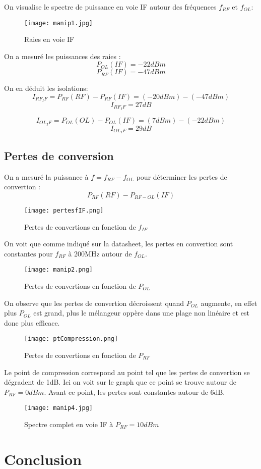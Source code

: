 \documentclass[oneside,a4paper,12pt]{article}
\begin{document}
	On visualise le spectre de puissance en voie IF autour des fréquences $f_{RF}$ et $f_{OL}$:

	\begin{figure}[h]
		\centering
		\texttt{[image: manip1.jpg]}	
		\caption{Raies en voie IF}
	\end{figure}

	On a mesuré les puissances des raies :
	\[ P_{OL}(IF) = -22dBm \]
	\[ P_{RF}(IF) = -47dBm \]

	On en déduit les isolations:
	\[ I_{RF_IF} = P_{RF}(RF) - P_{RF}(IF) = (-20 dBm) - (-47 dBm) \]
	\[ I_{RF_IF} = 27 dB \]

	\[ I_{OL_IF} = P_{OL}(OL) - P_{OL}(IF) = (7 dBm) - (-22 dBm) \]
	\[ I_{OL_IF} = 29 dB \]

	\newpage

	\subsection{Pertes de conversion}

	On a mesuré la puissance à $f = f_{RF}-f_{OL}$ pour déterminer les pertes de convertion :
	\[ P_{RF}(RF) - P_{RF-OL}(IF)  \]

	\begin{figure}[h]
		\centering
		\texttt{[image: pertesfIF.png]}	
		\caption{Pertes de convertions en fonction de $f_{IF}$}
	\end{figure}

	On voit que comme indiqué sur la datasheet, les pertes en convertion sont constantes pour $f_{RF}$ à 200MHz autour de $f_{OL}$.
	
	\begin{figure}[h]
		\centering
		\texttt{[image: manip2.png]}	
		\caption{Pertes de convertions en fonction de $P_{OL}$}
	\end{figure}

	On observe que les pertes de convertion décroissent quand $P_{OL}$ augmente, en effet plus $P_{OL}$ est grand,
	plus le mélangeur oppère dans une plage non linéaire et est donc plus efficace.

	\begin{figure}[h]
		\centering
		\texttt{[image: ptCompression.png]}	
		\caption{Pertes de convertions en fonction de $P_{RF}$}
	\end{figure}

	Le point de compression correspond au point tel que les pertes de convertion se dégradent de 1dB. 
	Ici on voit sur le graph que ce point se trouve autour de $P_{RF}=0dBm$. Avant ce point, les pertes sont constantes autour de 6dB.

	\begin{figure}[h]
		\centering
		\texttt{[image: manip4.jpg]}	
		\caption{Spectre complet en voie IF à $P_{RF} = 10dBm$}
	\end{figure}

	\newpage
	\section{Conclusion}
\end{document}
